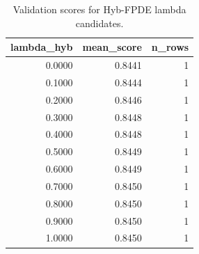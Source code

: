 \begin{table}[t]
\caption{Validation scores for Hyb-FPDE lambda candidates.}
\label{tab:lambda_distribution_computed}
\centering
\begin{tabular}{rrr}
\toprule
lambda\_hyb & mean\_score & n\_rows \\
\midrule
0.0000 & 0.8441 & 1 \\
0.1000 & 0.8444 & 1 \\
0.2000 & 0.8446 & 1 \\
0.3000 & 0.8448 & 1 \\
0.4000 & 0.8448 & 1 \\
0.5000 & 0.8449 & 1 \\
0.6000 & 0.8449 & 1 \\
0.7000 & 0.8450 & 1 \\
0.8000 & 0.8450 & 1 \\
0.9000 & 0.8450 & 1 \\
1.0000 & 0.8450 & 1 \\
\bottomrule
\end{tabular}

\end{table}
